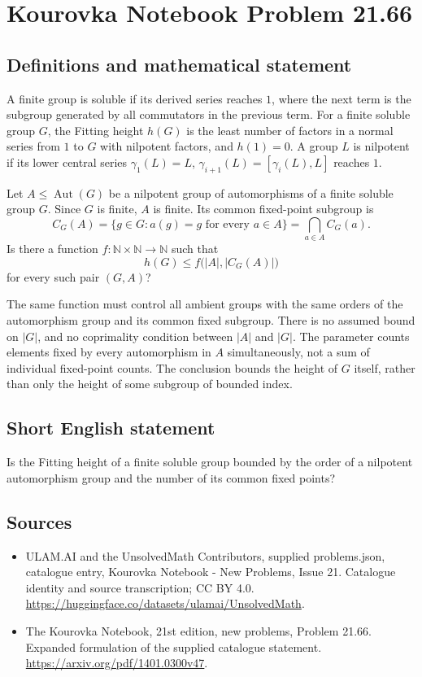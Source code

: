 \documentclass[11pt,a4paper]{article}
\begin{document}
\section*{Kourovka Notebook Problem 21.66}\label{statement}

\subsection{Definitions and mathematical statement}
A finite group is soluble if its derived series reaches $1$, where
the next term is the subgroup generated by all commutators in the
previous term. For a finite soluble group $G$, the Fitting height
$h(G)$ is the least number of factors in a normal series from $1$
to $G$ with nilpotent factors, and $h(1)=0$.
A group $L$ is nilpotent if its lower central series
$\gamma_1(L)=L$, $\gamma_{i+1}(L)=[\gamma_i(L),L]$ reaches $1$.

Let $A\le\operatorname{Aut}(G)$ be a nilpotent group of automorphisms
of a finite soluble group $G$. Since $G$ is finite, $A$ is finite.
Its common fixed-point subgroup is
\[
 C_G(A)=\{g\in G:a(g)=g\text{ for every }a\in A\}
        =\bigcap_{a\in A}C_G(a).
\]
Is there a function $f:\mathbb N\times\mathbb N\to\mathbb N$
such that
\[
 h(G)\le f\bigl(|A|,|C_G(A)|\bigr)
\]
for every such pair $(G,A)$?

The same function must control all ambient groups with the same
orders of the automorphism group and its common fixed subgroup.
There is no assumed bound on $|G|$, and no coprimality condition
between $|A|$ and $|G|$. The parameter counts elements fixed by every
automorphism in $A$ simultaneously, not a sum of individual fixed-point
counts. The conclusion bounds the height of $G$ itself, rather than
only the height of some subgroup of bounded index.
\subsection{Short English statement}
Is the Fitting height of a finite soluble group bounded by the order of a nilpotent automorphism group and the number of its common fixed points?
\subsection{Sources}
\begin{itemize}
\item[S1] ULAM.AI and the UnsolvedMath Contributors, supplied problems.json, catalogue entry, Kourovka Notebook - New Problems, Issue 21. Catalogue identity and source transcription; CC BY 4.0.
\url{https://huggingface.co/datasets/ulamai/UnsolvedMath}.
\item[S2] The Kourovka Notebook, 21st edition, new problems, Problem 21.66. Expanded formulation of the supplied catalogue statement.
\url{https://arxiv.org/pdf/1401.0300v47}.
\end{itemize}
\end{document}
